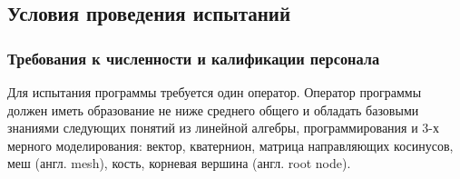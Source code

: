 \subsection{Условия проведения испытаний}

\subsubsection{Требования к численности и калификации персонала}
Для испытания программы требуется один оператор. Оператор программы должен иметь образование не ниже среднего общего и обладать базовыми знаниями следующих понятий из линейной алгебры, программирования и 3-х мерного моделирования: вектор, кватернион, матрица направляющих косинусов, меш (англ. mesh), кость, корневая вершина (англ. root node).




